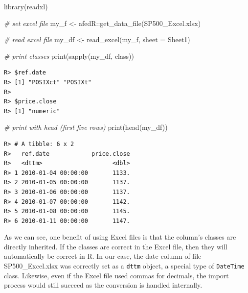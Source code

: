 \documentclass[
  12pt,
]{book}
\newenvironment{Shaded}{\begin{snugshade}}{\end{snugshade}}
\newcommand{\AttributeTok}[1]{\textcolor[rgb]{0.61,0.61,0.61}{#1}}
\newcommand{\CommentTok}[1]{\textcolor[rgb]{0.37,0.37,0.37}{\textit{#1}}}
\newcommand{\FunctionTok}[1]{\textcolor[rgb]{0,0,0}{#1}}
\newcommand{\NormalTok}[1]{#1}
\newcommand{\OtherTok}[1]{\textcolor[rgb]{0.37,0.37,0.37}{#1}}
\newcommand{\SpecialCharTok}[1]{\textcolor[rgb]{0,0,0}{#1}}
\newcommand{\StringTok}[1]{\textcolor[rgb]{0.5,0.5,0.5}{#1}}
\begin{document}
\begin{Shaded}
\begin{Highlighting}[]
\FunctionTok{library}\NormalTok{(readxl)}

\CommentTok{\# set excel file}
\NormalTok{my\_f }\OtherTok{\textless{}{-}}\NormalTok{ afedR}\SpecialCharTok{::}\FunctionTok{get\_data\_file}\NormalTok{(}\StringTok{\textquotesingle{}SP500\_Excel.xlsx\textquotesingle{}}\NormalTok{)}

\CommentTok{\# read excel file }
\NormalTok{my\_df }\OtherTok{\textless{}{-}} \FunctionTok{read\_excel}\NormalTok{(my\_f, }\AttributeTok{sheet =} \StringTok{\textquotesingle{}Sheet1\textquotesingle{}}\NormalTok{)}

\CommentTok{\# print classes}
\FunctionTok{print}\NormalTok{(}\FunctionTok{sapply}\NormalTok{(my\_df, class))}
\end{Highlighting}
\end{Shaded}

\begin{verbatim}
R> $ref.date
R> [1] "POSIXct" "POSIXt" 
R> 
R> $price.close
R> [1] "numeric"
\end{verbatim}

\begin{Shaded}
\begin{Highlighting}[]
\CommentTok{\# print with head (first five rows)}
\FunctionTok{print}\NormalTok{(}\FunctionTok{head}\NormalTok{(my\_df))}
\end{Highlighting}
\end{Shaded}

\begin{verbatim}
R> # A tibble: 6 x 2
R>   ref.date            price.close
R>   <dttm>                    <dbl>
R> 1 2010-01-04 00:00:00       1133.
R> 2 2010-01-05 00:00:00       1137.
R> 3 2010-01-06 00:00:00       1137.
R> 4 2010-01-07 00:00:00       1142.
R> 5 2010-01-08 00:00:00       1145.
R> 6 2010-01-11 00:00:00       1147.
\end{verbatim}

As we can see, one benefit of using Excel files is that the column's classes are directly inherited. If the classes are correct in the Excel file, then they will automatically be correct in R. In our case, the date column of file SP500\_Excel.xlsx was correctly set as a \texttt{dttm} object, a special type of \texttt{DateTime} class. Likewise, even if the Excel file used commas for decimals, the import process would still succeed as the conversion is handled internally.
\end{document}
